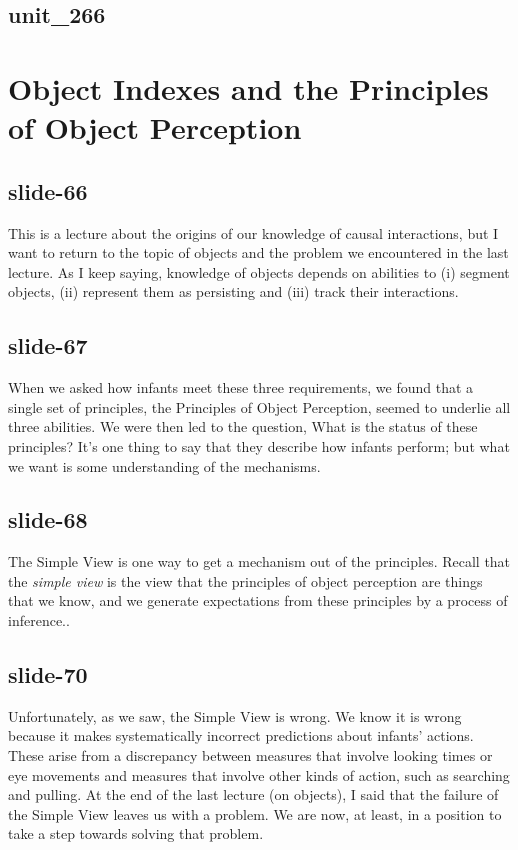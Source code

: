 \documentclass[12pt,\papersize]{extarticle}
\begin{document}
 
\subsection{unit\_266}
 
\section{Object Indexes and the Principles of Object Perception}
 
 
\subsection{slide-66}
This is a lecture about the origins of our knowledge of causal interactions, but I want to return to the topic of objects and the problem we encountered in the last lecture.
As I keep saying, knowledge of objects depends on abilities to (i) segment objects, (ii) represent them as persisting and (iii) track their interactions.
 
 
\subsection{slide-67}
When we asked how infants meet these three requirements, we found that a single set of principles, the Principles of Object Perception, seemed to underlie all three abilities.
We were then led to the question, What is the status of these principles? It's one thing to say that they describe how infants perform; but what we want is some understanding of the mechanisms.
 
 
\subsection{slide-68}
The Simple View is one way to get a mechanism out of the principles. Recall that the \emph{simple view} is the view that the principles of object perception are things that we know, and we generate expectations from these principles by a process of inference..
 
 
\subsection{slide-70}
Unfortunately, as we saw, the Simple View is wrong. We know it is wrong because it makes systematically incorrect predictions about infants' actions. These arise from a discrepancy between measures that involve looking times or eye movements and measures that involve other kinds of action, such as searching and pulling.
At the end of the last lecture (on objects), I said that the failure of the Simple View leaves us with a problem. We are now, at least, in a position to take a step towards solving that problem.
 
\end{document}
